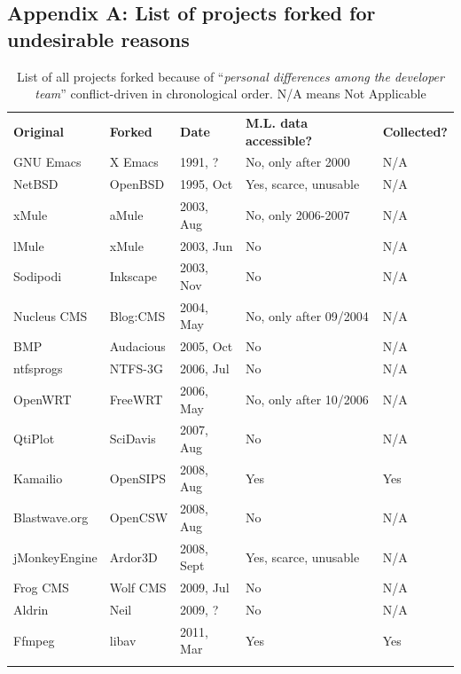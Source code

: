 \documentclass[12pt,letterpaper]{gthesis2}  %
\begin{document}
\begin{appendices}

\section{Appendix A: List of projects forked for undesirable reasons}
\label{tablesOfListsOfAllProjects}


\begin{table} [H]
\centering
\caption[List of all projects forked because of ``\textit{personal differences among the developer team}'' conflict-driven]{List of all projects forked because of ``\textit{personal differences among the developer team}'' conflict-driven \cite{Robles} in chronological order. N/A means Not Applicable}
\label{tabelProjectsForkedCat1PersonalDiffereces}       
\begin{tabular}{m{} m{} m{} m{} m{}}
\hline\noalign{\smallskip}
\textbf{Original} & \textbf{Forked} & \textbf{Date} & \textbf{M.L. data accessible?} & \textbf{Collected?}\\
\noalign{\smallskip}\hline\noalign{\smallskip}
GNU Emacs & X Emacs & 1991, ? & No, only after 2000 & N/A \\ \hline
NetBSD & OpenBSD & 1995, Oct & Yes, scarce, unusable & N/A \\ \hline
xMule & aMule & 2003, Aug & No, only 2006-2007 & N/A \\ \hline
lMule & xMule & 2003, Jun & No & N/A \\ \hline
Sodipodi & Inkscape & 2003, Nov & No & N/A\\ \hline
Nucleus CMS & Blog:CMS & 2004, May & No, only after 09/2004 & N/A \\ \hline
BMP & Audacious & 2005, Oct & No & N/A \\ \hline
ntfsprogs & NTFS-3G & 2006, Jul & No & N/A \\ \hline
OpenWRT & FreeWRT & 2006, May & No, only after 10/2006 & N/A \\ \hline
QtiPlot & SciDavis & 2007, Aug & No & N/A \\ \hline
Kamailio & OpenSIPS & 2008, Aug & Yes & Yes \\ \hline
Blastwave.org & OpenCSW & 2008, Aug & No & N/A \\ \hline
jMonkeyEngine & Ardor3D & 2008, Sept & Yes, scarce, unusable & N/A \\ \hline
Frog CMS & Wolf CMS & 2009, Jul & No & N/A \\ \hline
Aldrin & Neil & 2009, ? & No & N/A \\ \hline
Ffmpeg & libav & 2011, Mar & Yes & Yes\\
\noalign{\smallskip}\hline
\end{tabular}
\end{table}


\end{appendices}
\end{document}
